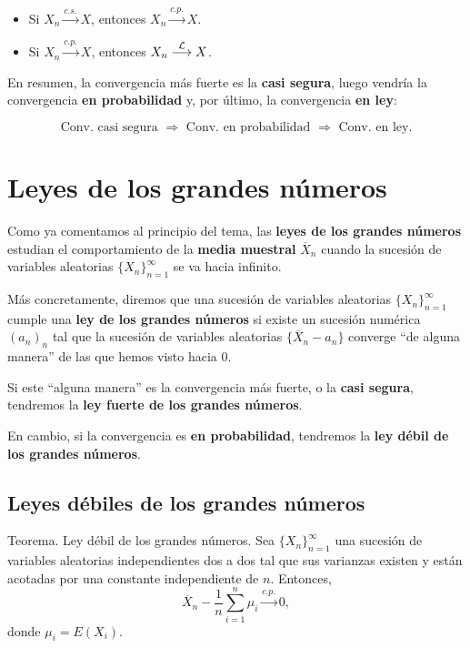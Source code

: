 \documentclass[]{book}
\begin{document}
\begin{itemize}
\item
  Si \(X_n\stackrel{c.s.}{\longrightarrow} X\), entonces \(X_n\stackrel{c.p.}{\longrightarrow} X\).
\item
  Si \(X_n\stackrel{c.p.}{\longrightarrow} X\), entonces \(X_n\stackrel{{\cal L}}{\longrightarrow} X\).
\end{itemize}

En resumen, la convergencia más fuerte es la \textbf{casi segura}, luego vendría la convergencia \textbf{en probabilidad} y, por último, la convergencia \textbf{en ley}:

\[
\mbox{Conv. casi segura }\Rightarrow \mbox{ Conv. en probabilidad }\Rightarrow\mbox{ Conv. en ley.}
\]

\hypertarget{leyes-de-los-grandes-nuxfameros}{%
\section{Leyes de los grandes números}\label{leyes-de-los-grandes-nuxfameros}}

Como ya comentamos al principio del tema, las \textbf{leyes de los grandes números} estudian el comportamiento de la \textbf{media muestral} \(\overline{X}_n\) cuando la sucesión de variables aleatorias \(\{X_n\}_{n=1}^\infty\) se va hacia infinito.

Más concretamente, diremos que una sucesión de variables aleatorias \(\{X_n\}_{n=1}^\infty\) cumple una \textbf{ley de los grandes números} si existe un sucesión numérica \((a_n)_n\) tal que la sucesión de variables aleatorias \(\{\overline{X}_n-a_n\}\) converge ``de alguna manera'' de las que hemos visto hacia 0.

Si este ``alguna manera'' es la convergencia más fuerte, o la \textbf{casi segura}, tendremos la \textbf{ley fuerte de los grandes números}.

En cambio, si la convergencia es \textbf{en probabilidad}, tendremos la \textbf{ley débil de los grandes números}.

\hypertarget{leyes-duxe9biles-de-los-grandes-nuxfameros}{%
\subsection{Leyes débiles de los grandes números}\label{leyes-duxe9biles-de-los-grandes-nuxfameros}}

 Teorema. Ley débil de los grandes números.
Sea \(\{X_n\}_{n=1}^\infty\) una sucesión de variables aleatorias independientes dos a dos tal que sus varianzas existen y están acotadas por una constante independiente de \(n\). Entonces,
\[
\overline{X}_n-\frac{1}{n}\sum_{i=1}^n \mu_i\stackrel{c.p.}{\longrightarrow} 0,
\]
donde \(\mu_i = E(X_i)\).
\end{document}
